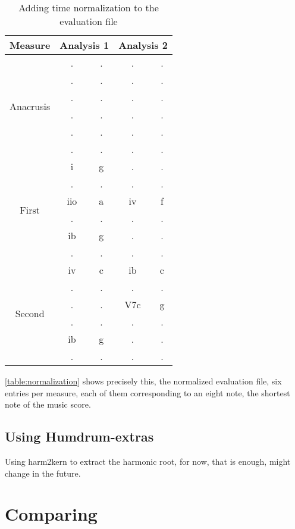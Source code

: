 		\begin{table}[tbp]
		\centering
		\begin{tabular}{|c|c|c|c|c|}
		\hline
		Measure & \multicolumn{2}{c|}{Analysis 1} & \multicolumn{2}{c|}{Analysis 2} \\ \hline
		\multirow{6}{*}{Anacrusis} & . & . & . & . \\ \cline{2-5}
		 & . & . & . & . \\ \cline{2-5}
		 & . & . & . & . \\ \cline{2-5}
		 & . & . & . & . \\ \cline{2-5}
		 & . & . & . & . \\ \cline{2-5}
		 & . & . & . & . \\ \hline
		\multirow{6}{*}{First} & i & g & . & . \\ \cline{2-5}
		 & . & . & . & . \\ \cline{2-5}
		 & iio & a & iv & f \\ \cline{2-5}
		 & . & . & . & . \\ \cline{2-5}
		 & ib & g & . & . \\ \cline{2-5}
		 & . & . & . & . \\ \hline
		\multirow{6}{*}{Second} & iv & c & ib & c \\ \cline{2-5}
		 & . & . & . & . \\ \cline{2-5}
		 & . & . & V7c & g \\ \cline{2-5}
		 & . & . & . & . \\ \cline{2-5}
		 & ib & g & . & . \\ \cline{2-5}
		 & . & . & . & . \\ \hline
		\end{tabular}
		\caption{Adding time normalization to the evaluation file}
		\label{table:normalization}
		\end{table}

		\autoref{table:normalization} shows precisely this, the normalized evaluation file, six entries per measure, each of them corresponding to an eight note, the shortest note of the music score.

	\subsection{Using Humdrum-extras}
  Using harm2kern to extract the harmonic root, for now, that is enough, might change in the future.
\section{Comparing}
